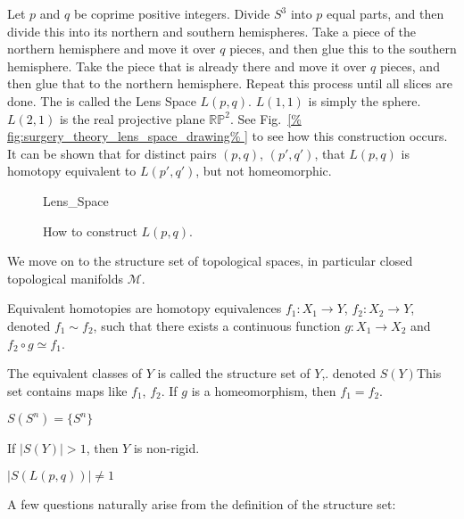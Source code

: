 \documentclass[crop=false,class=article,oneside]{standalone}
\begin{document}
        Let $p$ and $q$ be coprime positive integers.
        Divide $S^{3}$ into $p$ equal parts, and then divide
        this into its northern and southern hemispheres.
        Take a piece of the northern hemisphere and move
        it over $q$ pieces, and then glue this to the
        southern hemisphere. Take the piece that is already
        there and move it over $q$ pieces, and then glue
        that to the northern hemisphere. Repeat this
        process until all slices are done. The is called
        the Lens Space $L(p,q)$. $L(1,1)$ is simply the
        sphere. $L(2,1)$ is the real projective plane
        $\mathbb{RP}^{2}$.
        See Fig.~\ref{%
            fig:surgery_theory_lens_space_drawing%
        }
        to see how this construction occurs.
        It can be shown that for distinct pairs
        $(p,q)$, $(p',q')$, that $L(p,q)$ is homotopy
        equivalent to $L(p',q')$, but not homeomorphic.
        \begin{figure}[H]
            \centering
            \captionsetup{type=figure}
            {Lens_Space}
            \caption{How to construct $L(p,q)$.}
            \label{fig:surgery_theory_lens_space_drawing}
        \end{figure}
        We move on to the structure set of topological spaces,
        in particular closed topological
        manifolds $\mathcal{M}$.
        \begin{definition}
                Equivalent homotopies are homotopy equivalences
                $f_{1}:X_{1}\rightarrow Y$,
                $f_{2}:X_{2}\rightarrow Y$,
                denoted $f_{1}\sim{f_{2}}$, such that there
                exists a continuous function
                $g:X_{1}\rightarrow{X_{2}}$ and
                $f_{2}\circ{g}\simeq{f_{1}}$.
            \end{definition}
        The equivalent classes of $Y$ is called the
        structure set of $Y$,.
        denoted $S(Y)$This set contains maps
        like $f_{1}$, $f_{2}$.
        If $g$ is a homeomorphism, then $f_{1}=f_{2}$.
        \begin{example}
                $S(S^{n})=\{S^{n}\}$
            \end{example}
        If $|S(Y)|>1$, then $Y$ is non-rigid.
        \begin{example}
                $|S(L(p,q))|\ne{1}$
            \end{example}
        A few questions naturally arise from the
        definition of the structure set:
\end{document}
